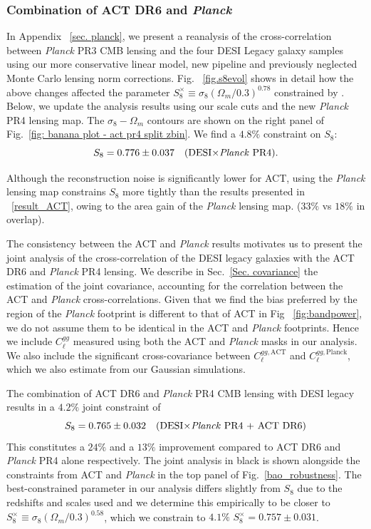 \documentclass[twocolumn]{aastex631}
\begin{document}
{\subsubsection{Combination of ACT DR6 and \textit{Planck}} \label{sec. Planck_ACT}

In Appendix ~\ref{sec. planck}, we present a reanalysis of the cross-correlation between \textit{Planck} PR3 CMB lensing and the four DESI Legacy galaxy samples using our more conservative linear model, new pipeline and previously neglected Monte Carlo lensing norm corrections. Fig. ~\ref{fig.s8evol} shows in detail how the above changes affected the parameter $S^{\times}_8\equiv\sigma_8(\Omega_m/0.3)^{0.78}$ constrained by \cite{hang2021}. Below, we update the analysis results using our scale cuts and the new \textit{Planck} PR4  lensing map. The $\sigma_8-\Omega_m$ contours are shown on the right panel of Fig.~\ref{fig: banana plot - act pr4 split zbin}. We find a $4.8\%$ constraint on $S_8$:
\begin{equation}
    S_8=0.776\pm0.037 \quad \text{(DESI$\times$\textit{Planck} PR4)}.
\end{equation}

Although the reconstruction noise is significantly lower for ACT, using the \textit{Planck} lensing map constrains $S_8$ more tightly than the results presented in ~\ref{result_ACT}, owing to the area gain of the \textit{Planck} lensing map. ($33\%$ vs $18\%$ in overlap).

The consistency between the ACT and \textit{Planck} results motivates us to present the joint analysis of the cross-correlation of the DESI legacy galaxies with the ACT DR6 and \textit{Planck} PR4 lensing. We describe in Sec.~\ref{Sec. covariance}  the estimation of the joint covariance, accounting for the correlation between the ACT and \textit{Planck} cross-correlations. Given that we find the bias preferred by the region of the  \textit{Planck} footprint is different to that of ACT in Fig ~\ref{fig:bandpower}, we do not assume them to be identical in the ACT and \textit{Planck} footprints. Hence we include $C^{gg}_\ell$
measured using both the ACT and \textit{Planck} masks in our analysis. We also include the significant cross-covariance between $C^{gg,\mathrm{ACT}}_\ell$ and $C^{gg,\mathrm{Planck}}_\ell$, which we also estimate from our Gaussian simulations.

The combination of ACT DR6 and \textit{Planck} PR4 CMB lensing with DESI legacy results in a $4.2\%$ joint constraint of
\begin{equation}
    S_8=0.765\pm0.032 \quad \text{(DESI$\times$\textit{Planck} PR4 + ACT DR6)}
\end{equation}
This constitutes a $24\%$ and a $13\%$ improvement compared to ACT DR6 and \textit{Planck} PR4 alone respectively. The joint analysis in black is shown alongside the constraints from ACT and \textit{Planck} in the top panel of  Fig.~\ref{bao_robustness}. 
The best-constrained parameter in our analysis differs slightly from $S_8$ due to the redshifts and scales used and we determine this empirically to be closer to $S^{\times}_8\equiv\sigma_8(\Omega_m/0.3)^{0.58}$, which we constrain to  $4.1\%$ $S^{\times}_8=0.757\pm0.031$.

}
\end{document}
